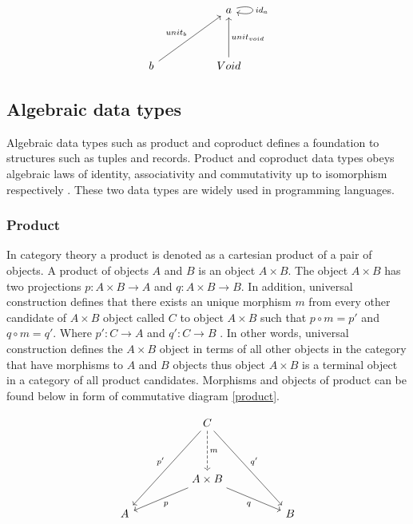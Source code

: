 \documentclass[article]{aaltoseries}
\begin{document}
    \begin{equation}
      \label{terminal}
      \begin{tikzcd}[row sep=huge, column sep=huge]
        & a \arrow[loop right, distance=2em, "id_{a}"] \\
        b \arrow[ur, "unit_b"]
        & Void \arrow[u, "unit_{void}"']
      \end{tikzcd}
    \end{equation}
   

  \subsection{Algebraic data types}
    Algebraic data types such as product and coproduct defines a foundation to
    structures such as tuples and records. Product and coproduct data types
    obeys algebraic laws of identity, associativity and commutativity up to
    isomorphism respectively \cite{barr1990category}. These two data types are
    widely used in programming languages.


  \subsubsection{Product}
    In category theory a product is denoted as a cartesian product of a pair of
    objects. A product of objects $A$ and $B$ is an object $A \times B$. The
    object $A \times B$ has two projections $p : A \times B \rightarrow A$ and
    $q : A \times B \rightarrow B$. In addition, universal construction defines
    that there exists an unique morphism $m$ from every other candidate of $A
    \times B$ object called $C$ to object $A \times B$ such that $p \circ m =
    p'$ and $q \circ m = q'$. Where $p' : C \rightarrow A$ and $q' : C
    \rightarrow B$ \cite{barr1990category, pierce1991basic}. In
    other words, universal construction defines the $A \times B$ object in terms
    of all other objects in the category that have morphisms to $A$ and $B$
    objects thus object $A \times B$ is a terminal object in a category of all
    product candidates. Morphisms and objects of product can be found below in
    form of commutative diagram \ref{product}.

    \begin{equation}
      \label{product}
      \begin{tikzcd}[row sep=huge, column sep=huge]
        & C \arrow[d, dashed, "m"]
        \arrow[ddl, "p'"']
        \arrow[ddr, "q'"]
        & \\
        & A \times B \arrow[dl, "p"]
        \arrow[dr, "q"']
        & \\
        [-2em] A
        &
        & B
      \end{tikzcd}
    \end{equation}
\end{document}
